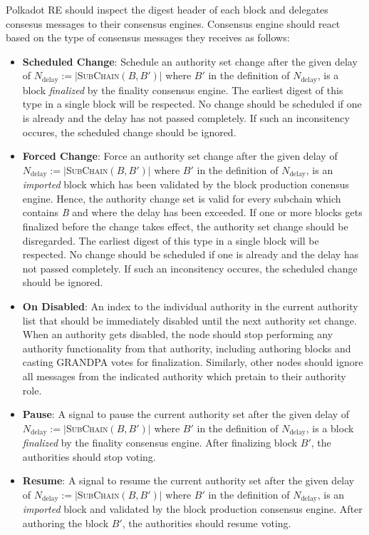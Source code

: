\documentclass{book}
\newcommand{\assign}{:=}
\newcommand{\nobracket}{}
\newcommand{\tmem}[1]{{\em #1\/}}
\newcommand{\tmname}[1]{\textsc{#1}}
\newcommand{\tmop}[1]{\ensuremath{\operatorname{#1}}}
\newcommand{\tmstrong}[1]{\textbf{#1}}
\newcommand{\tmtextbf}[1]{{\bfseries{#1}}}
\newcommand{\tmtextit}[1]{{\itshape{#1}}}
\newcommand{\tmtextsc}[1]{{\scshape{#1}}}
\newenvironment{itemizeminus}{\begin{itemize} \renewcommand{\labelitemi}{$-$}\renewcommand{\labelitemii}{$-$}\renewcommand{\labelitemiii}{$-$}\renewcommand{\labelitemiv}{$-$}}{\end{itemize}}
\providecommand{\nobracket}{}
\providecommand{\tmem}[1]{\tmtextit{#1}}
\providecommand{\tmname}[1]{\tmtextsc{#1}}
\providecommand{\tmop}[1]{\ensuremath{\mathrm{#1}}}
\providecommand{\tmstrong}[1]{\tmtextbf{#1}}
\providecommand{\tmtextbf}[1]{\tmtextbf{#1}}
\providecommand{\tmtextit}[1]{\tmtextit{#1}}
\begin{document}
Polkadot RE should inspect the digest header of each block and delegates
consesus messages to their consensus engines. Consensus engine should react
based on the type of consensus messages they receives as follows:
\begin{itemizeminus}
  \item {\tmstrong{Scheduled Change}}: Schedule an authority set change after
  the given delay of $N_{\tmop{delay}} \assign |
  \nobracket${\tmname{SubChain}}$(B, B') | \nobracket$ where $B'$ in the
  definition of $N_{\tmop{delay}}$, is a block {\tmem{finalized}} by the
  finality consensus engine. The earliest digest of this type in a single
  block will be respected. No change should be scheduled if one is already and
  the delay has not passed completely. If such an inconsitency occures, the
  scheduled change should be ignored.
  
  \item {\tmstrong{Forced Change}}: Force an authority set change after the
  given delay of $N_{\tmop{delay}} \assign |
  \nobracket${\tmname{SubChain}}$(B, B') | \nobracket$ where $B'$ in the
  definition of $N_{\tmop{delay}}$, is an {\tmem{imported}} block which has
  been validated by the block production conensus engine. Hence, the authority
  change set is valid for every subchain which contains {\tmem{B}} and where
  the delay has been exceeded. If one or more blocks gets finalized before the
  change takes effect, the authority set change should be disregarded. The
  earliest digest of this type in a single block will be respected. No change
  should be scheduled if one is already and the delay has not passed
  completely. If such an inconsitency occures, the scheduled change should be
  ignored.
  
  \item {\tmstrong{On Disabled}}: An index to the individual authority in the
  current authority list that should be immediately disabled until the next
  authority set change. When an authority gets disabled, the node should stop
  performing any authority functionality from that authority, including
  authoring blocks and casting GRANDPA votes for finalization. Similarly,
  other nodes should ignore all messages from the indicated authority which
  pretain to their authority role.
  
  \item {\tmstrong{Pause}}: A signal to pause the current authority set after
  the given delay of $N_{\tmop{delay}} \assign |
  \nobracket${\tmname{SubChain}}$(B, B') | \nobracket$ where $B'$ in the
  definition of $N_{\tmop{delay}}$, is a block {\tmem{finalized}} by the
  finality consensus engine. After finalizing block $B'$, the authorities
  should stop voting.
  
  \item {\tmstrong{Resume}}: A signal to resume the current authority set
  after the given delay of $N_{\tmop{delay}} \assign |
  \nobracket${\tmname{SubChain}}$(B, B') | \nobracket$ where $B'$ in the
  definition of $N_{\tmop{delay}}$, is an {\tmem{imported}} block and
  validated by the block production consensus engine. After authoring the
  block $B'$, the authorities should resume voting.
\end{itemizeminus}
\end{document}
